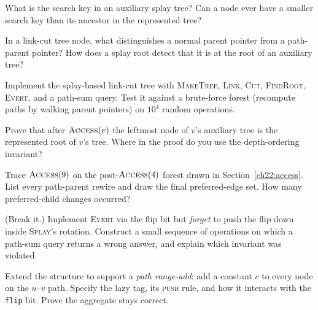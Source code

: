 \begin{exercise}
What is the search key in an auxiliary splay tree? Can a node ever have a smaller search key than its ancestor in the represented tree?
\end{exercise}

\begin{exercise}
In a link-cut tree node, what distinguishes a normal parent pointer from a path-parent pointer? How does a splay root detect that it is at the root of an auxiliary tree?
\end{exercise}

\begin{exercise}
Implement the splay-based link-cut tree with \textsc{MakeTree}, \textsc{Link},
\textsc{Cut}, \textsc{FindRoot}, \textsc{Evert}, and a path-sum query. Test it
against a brute-force forest (recompute paths by walking parent pointers) on
$10^4$ random operations.
\end{exercise}

\begin{exercise}
Prove that after $\textsc{Access}(v)$ the leftmost node of $v$'s auxiliary tree is
the represented root of $v$'s tree. Where in the proof do you use the
depth-ordering invariant?
\end{exercise}

\begin{exercise}
Trace $\textsc{Access}(9)$ on the post-$\textsc{Access}(4)$ forest drawn in
Section~\ref{ch22:access}. List every path-parent rewire and draw the final
preferred-edge set. How many preferred-child changes occurred?
\end{exercise}

\begin{exercise}
(Break it.) Implement \textsc{Evert} via the flip bit but \emph{forget} to push
the flip down inside \textsc{Splay}'s rotation. Construct a small sequence of
operations on which a path-sum query returns a wrong answer, and explain which
invariant was violated.
\end{exercise}

\begin{exercise}
Extend the structure to support a \emph{path range-add}: add a constant $c$ to
every node on the $u$--$v$ path. Specify the lazy tag, its \textsc{push} rule, and
how it interacts with the \texttt{flip} bit. Prove the aggregate stays correct.
\end{exercise}

